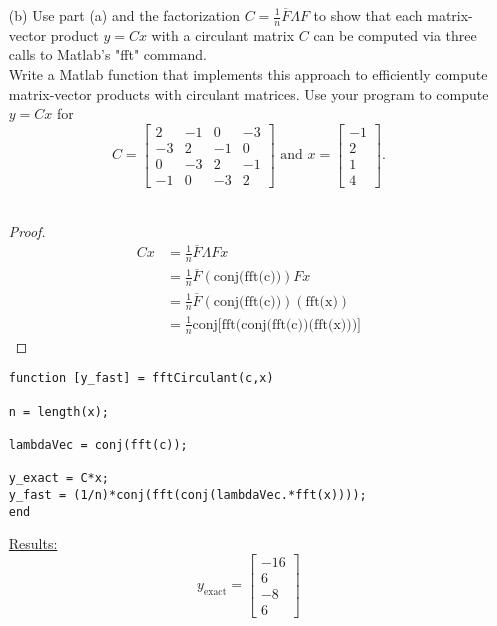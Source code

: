 \documentclass[12pt]{article}
\begin{document}
\begin{itemize}
\item[(b)] Use part (a) and the factorization $C = \frac{1}{n}\overline{F}\Lambda F$ to show that each matrix-vector product $y = Cx$ with a circulant matrix $C$ can be computed via three calls to Matlab's "fft" command.\\
Write a Matlab function that implements this approach to efficiently compute matrix-vector products with circulant matrices.  Use your program to compute $y=Cx$ for
$$C = \begin{bmatrix}
		2 & -1 & 0 & -3 \\
		-3 & 2 & -1 & 0 \\
		0 & -3 & 2 & -1 \\
		-1 & 0 & -3 & 2 
		\end{bmatrix}
\text{ and } x = \begin{bmatrix}
				-1 \\
				2 \\
				1 \\
				4
				\end{bmatrix}.$$\\
\begin{proof} $\text{ }$\\
\begin{align}
Cx &= \frac{1}{n}\overline{F}\Lambda Fx \nonumber \\
&= \frac{1}{n}\overline{F}(\text{conj(fft(c))})Fx \nonumber \\
&= \frac{1}{n}\overline{F}(\text{conj(fft(c))})(\text{fft(x)}) 			\nonumber \\
&= \frac{1}{n} \text{conj[fft(conj(fft(c))(fft(x)))]} \nonumber
\end{align}
\end{proof}

\lstset{language=matlab,frame=single}
\begin{lstlisting}[caption=Circulant Matrix-Vector Product Function]
function [y_fast] = fftCirculant(c,x)

n = length(x);
 
lambdaVec = conj(fft(c));
 
y_exact = C*x;
y_fast = (1/n)*conj(fft(conj(lambdaVec.*fft(x))));
end
\end{lstlisting}


 \underline{Results:}\\
 $$y_{\text{exact}} = \begin{bmatrix}
 			-16 \\
 			6 \\
 			-8 \\
 			6 
 			\end{bmatrix}$$
 

\end{itemize}
\end{document}
